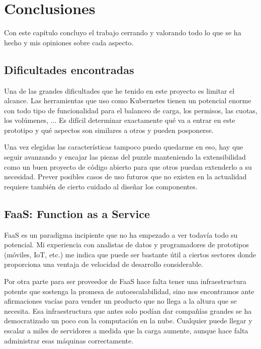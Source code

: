 \chapter{Conclusiones}
\label{chap:conclusiones}

Con este capítulo concluyo el trabajo cerrando y valorando todo lo que se ha hecho y mis opiniones sobre cada aspecto.

\section{Dificultades encontradas}

Una de las grandes dificultades que he tenido en este proyecto es limitar el alcance. Las herramientas que uso como Kubernetes tienen un potencial enorme con todo tipo de funcionalidad para el balanceo de carga, los permisos, las cuotas, los volúmenes, ... Es difícil determinar exactamente qué va a entrar en este prototipo y qué aspectos son similares a otros y pueden posponerse.

Una vez elegidas las características tampoco puedo quedarme en eso, hay que seguir avanzando y encajar las piezas del puzzle manteniendo la extensibilidad como un buen proyecto de código abierto para que otros puedan extenderlo a su necesidad. Prever posibles casos de uso futuros que no existen en la actualidad requiere también de cierto cuidado al diseñar los componentes.

\section{FaaS: Function as a Service}

FaaS es un paradigma incipiente que no ha empezado a ver todavía todo su potencial. Mi experiencia con analistas de datos y programadores de prototipos (móviles, IoT, etc.) me indica que puede ser bastante útil a ciertos sectores donde proporciona una ventaja de velocidad de desarrollo considerable.

Por otra parte para ser proveedor de FaaS hace falta tener una infraestructura potente que sostenga la promesa de autoescalabilidad, sino nos encontramos ante afirmaciones vacías para vender un producto que no llega a la altura que se necesita. Esa infraestructura que antes solo podían dar compañías grandes se ha democratizado un poco con la computación en la nube. Cualquier puede llegar y escalar a miles de servidores a medida que la carga aumente, aunque hace falta administrar esas máquinas correctamente.

